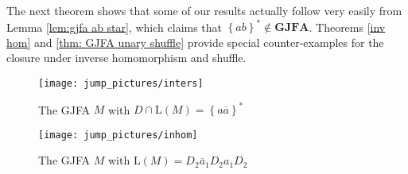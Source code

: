 \documentclass{ws-ijmpc}
\begin{document}
The next theorem shows that some of our results actually follow very
easily from Lemma \ref{lem:gjfa ab star}, which claims that $\left\{ ab\right\} ^{*}\notin\mathbf{GJFA}$.
Theorems \ref{inv hom} and \ref{thm: GJFA unary shuffle} provide
special counter-examples for the closure under inverse homomorphism
and shuffle.
\begin{figure}
\begin{centering}
\texttt{[image: jump\_pictures/inters]}
\par\end{centering}

\caption{\label{fig:The-GJFA M inters}The GJFA $M$ with $D\cap\mathrm{L}\!\left(M\right)=\left\{ a\overline{a}\right\} ^{*}$}
\end{figure}
\begin{figure}
\begin{centering}
\texttt{[image: jump\_pictures/inhom]}
\par\end{centering}

\caption{\label{fig:The-GJFA M}The GJFA $M$ with $\mathrm{L}\!\left(M\right)=D_{2}\overline{a}_{1}D_{2}a_{1}D_{2}$}
\end{figure}
\end{document}
